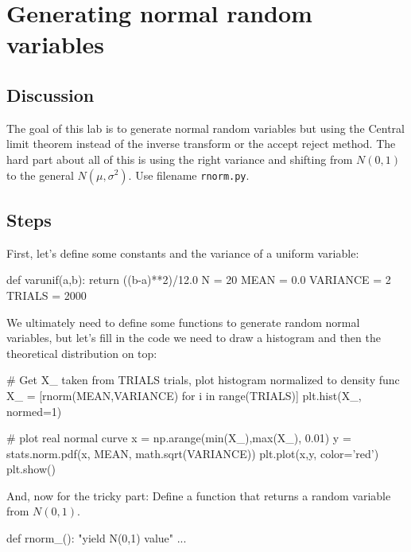 \chapter{Generating normal random variables}

\setcounter{problem}{1}
\section{Discussion}

\begin{fullwidth}


The goal of this lab is to generate normal random variables but using the Central limit  theorem instead of the inverse transform or the accept reject method. The hard part about all of this is using the right variance and shifting from $N(0,1)$ to the general $N(\mu, \sigma^2)$. Use filename {\tt rnorm.py}.

\section{Steps}

\step First, let's define some constants and the variance of a uniform variable:

\begin{pyverbatim}
def varunif(a,b):
	return ((b-a)**2)/12.0
N = 20
MEAN = 0.0
VARIANCE = 2
TRIALS = 2000
\end{pyverbatim}

\step  We ultimately need to define some functions to generate random normal variables, but let's fill in the code we need to draw a histogram and then the theoretical distribution on top:

\begin{pyverbatim}
# Get X_ taken from TRIALS trials, plot histogram normalized to density func
X_ = [rnorm(MEAN,VARIANCE) for i in range(TRIALS)]
plt.hist(X_, normed=1)

# plot real normal curve
x = np.arange(min(X_),max(X_), 0.01)
y = stats.norm.pdf(x, MEAN, math.sqrt(VARIANCE))
plt.plot(x,y, color='red')
plt.show()
\end{pyverbatim}

\step And, now for the tricky part:  Define a function that returns a random variable from $N(0,1)$.

\begin{pyverbatim}
def rnorm_():
    "yield N(0,1) value"
    ...
\end{pyverbatim}	


\end{fullwidth}
